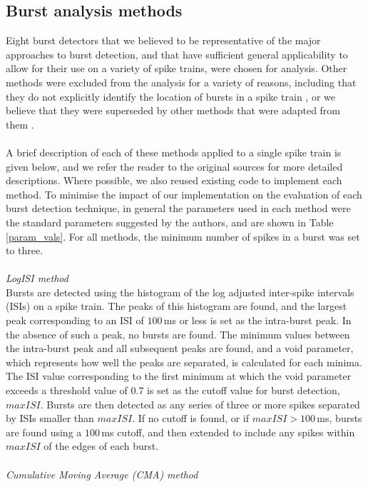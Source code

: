 \documentclass[12pt, titlepage]{article}
\begin{document}
\subsection*{Burst analysis methods}
Eight burst detectors that we believed to be representative of the major approaches to burst detection, and that have sufficient general applicability to allow for their use on a variety of spike trains, were chosen for analysis. Other methods were excluded from the analysis for a variety of reasons, including that they do not explicitly identify the location of bursts in a spike train \cite{VanElburg2004}, or we believe that they were superseded by other methods that were adapted from them \cite{Selinger2007,Chiappalone2005}.  
\\ \\ A brief description of each of these methods applied to a single spike train is given below, and we refer the reader to the original sources for more detailed descriptions. Where possible, we also reused existing code to implement each method. To minimise the impact of our implementation on the evaluation of each burst detection technique, in general the parameters used in each method were the standard parameters suggested by the authors, and are shown in Table \ref{param_vals}.  For all methods, the minimum number of spikes in a burst was set to three. 
\\ \\ \textit{LogISI method \cite{Pasquale2010}} 
\\Bursts are detected using the histogram of the log adjusted inter-spike intervals (ISIs) on a spike train. The peaks of this histogram are found, and the largest peak corresponding to an ISI of $100\,$ms or less is set as the intra-burst peak. In the absence of such a peak, no bursts are found. The minimum values between the intra-burst peak and all subsequent peaks are found, and a void parameter, which represents how well the peaks are separated, is calculated for each minima. The ISI value corresponding to the first minimum at which the void parameter exceeds a threshold value of 0.7 is set as the cutoff value for burst detection, $maxISI$.  Bursts are then detected as any series of three or more spikes separated by ISIs smaller than $maxISI$. If no cutoff is found, or if $maxISI>100\,$ms, bursts are found using a $100\,$ms cutoff, and then extended to include any spikes within $maxISI$ of the edges of each burst.
\\ \\ \textit{Cumulative Moving Average (CMA) method \cite{Kapucu2012}} 
\end{document}
